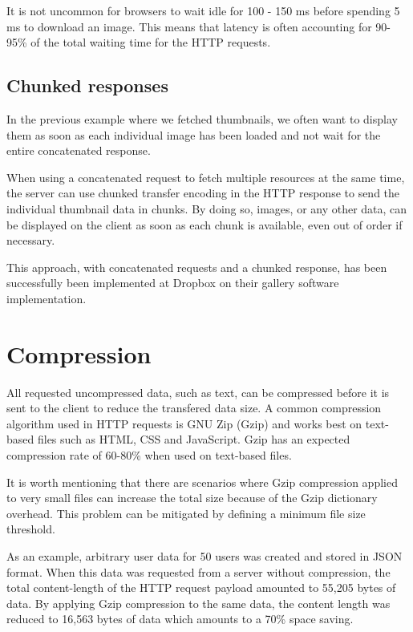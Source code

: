 \documentclass{cslthse-msc}
\begin{document}
It is not uncommon for browsers to wait idle for 100 - 150 ms before spending 5 ms to download an image. This means that latency is often accounting for 90-95\% of the total waiting time for the HTTP requests\cite{latency}.

\subsection{Chunked responses}
In the previous example where we fetched thumbnails, we often want to display them as soon as each individual image has been loaded and not wait for the entire concatenated response. 

When using a concatenated request to fetch multiple resources at the same time, the server can use chunked transfer encoding in the HTTP response to send the individual thumbnail data in chunks\cite{chunked}. By doing so, images, or any other data, can be displayed on the client as soon as each chunk is available, even out of order if necessary. 

This approach, with concatenated requests and a chunked response, has been successfully been implemented at Dropbox on their gallery software implementation\cite{dropbox_chunked}.

\section{Compression}
\label{compression}

All requested uncompressed data, such as text, can be compressed before it is sent to the client to reduce the transfered data size. A common compression algorithm used in HTTP requests is GNU Zip (Gzip) and works best on text-based files such as HTML, CSS and JavaScript. Gzip has an expected compression rate of 60-80\% when used on text-based files\cite[page 237]{HPBN}.

It is worth mentioning that there are scenarios where Gzip compression applied to very small files can increase the total size because of the Gzip dictionary overhead. This problem can be mitigated by defining a minimum file size threshold\cite{google_gzip}.

As an example, arbitrary user data for 50 users was created and stored in JSON format. When this data was requested from a server without compression, the total content-length of the HTTP request payload amounted to 55,205 bytes of data. By applying Gzip compression to the same data, the content length was reduced to 16,563 bytes of data which amounts to a 70\% space saving. 
\end{document}
